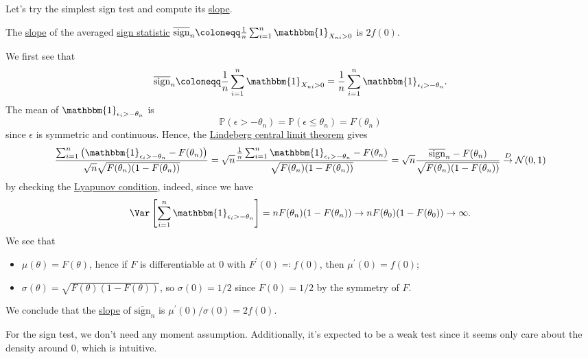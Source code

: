 Let's try the simplest sign test and compute its \hyperref[def:slope]{slope}.

\begin{eg}
	The \hyperref[def:slope]{slope} of the averaged \hyperref[def:sign-statistic]{sign statistic} \(\overline{\mathrm{sign}} _n \coloneqq \frac{1}{n} \sum_{i=1}^{n} \mathbbm{1}_{X_{ni} > 0} \) is \(2 f(0)\).
\end{eg}
\begin{explanation}
	We first see that
	\[
		\overline{\mathrm{sign}} _n
		\coloneqq \frac{1}{n} \sum_{i=1}^{n} \mathbbm{1}_{X_{ni} > 0}
		= \frac{1}{n} \sum_{i=1}^{n} \mathbbm{1}_{\epsilon _i > - \theta _n}.
	\]
	The mean of \(\mathbbm{1}_{\epsilon _i > -\theta _n} \) is
	\[
		\mathbb{P} (\epsilon > -\theta _n)
		= \mathbb{P} (\epsilon \leq \theta _n)
		= F(\theta _n)
	\]
	since \(\epsilon \) is symmetric and continuous. Hence, the \hyperref[thm:Lindeberg-CLT]{Lindeberg central limit theorem} gives
	\[
		\frac{\sum_{i=1}^{n} \left( \mathbbm{1}_{\epsilon _i  > -\theta _n} - F(\theta _n) \right) }{\sqrt{n} \sqrt{F(\theta _n) (1 - F(\theta _n))} }
		= \sqrt{n} \frac{\frac{1}{n} \sum_{i=1}^{n} \mathbbm{1}_{\epsilon _i > -\theta _n} - F(\theta _n) }{\sqrt{F(\theta _n) (1 - F(\theta _n)) } }
		= \sqrt{n} \frac{\overline{\mathrm{sign}} _n - F(\theta _n) }{\sqrt{F(\theta _n) (1 - F(\theta _n)) } }
		\overset{D}{\to} \mathcal{N} (0, 1)
	\]
	by checking the \hyperref[col:Lyapunov-CLT]{Lyapunov condition}, indeed, since we have
	\[
		\Var_{}\left[\sum_{i=1}^{n} \mathbbm{1}_{\epsilon _i > -\theta _n} \right]
		= n F(\theta _n) (1 - F(\theta _n))
		\to n F(\theta _0) (1 - F(\theta _0))
		\to \infty.
	\]
	We see that
	\begin{itemize}
		\item \(\mu (\theta ) = F(\theta ) \), hence if \(F\) is differentiable at \(0\) with \(F^{\prime} (0) \eqqcolon f(0)\), then \(\mu ^{\prime} (0) = f(0)\);
		\item \(\sigma (\theta ) = \sqrt{F(\theta )(1 - F(\theta ))} \), so \(\sigma (0) = 1 / 2\) since \(F(0) = 1 / 2\) by the symmetry of \(F\).
	\end{itemize}
	We conclude that the \hyperref[def:slope]{slope} of \(\overline{\mathrm{sign}} _n\) is \(\mu ^{\prime} (0) / \sigma (0) = 2f(0)\).
\end{explanation}

\begin{note}
	For the sign test, we don't need any moment assumption. Additionally, it's expected to be a weak test since it seems only care about the density around \(0\), which is intuitive.
\end{note}


